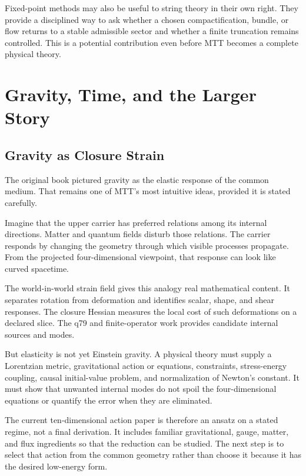 \documentclass[11pt,openany]{book}
\begin{document}
Fixed-point methods may also be useful to string theory in their own right.
They provide a disciplined way to ask whether a chosen compactification,
bundle, or flow returns to a stable admissible sector and whether a finite
truncation remains controlled. This is a potential contribution even before
MTT becomes a complete physical theory.

\part{Gravity, Time, and the Larger Story}

\chapter{Gravity as Closure Strain}

The original book pictured gravity as the elastic response of the common
medium. That remains one of MTT's most intuitive ideas, provided it is stated
carefully.

Imagine that the upper carrier has preferred relations among its internal
directions. Matter and quantum fields disturb those relations. The carrier
responds by changing the geometry through which visible processes propagate.
From the projected four-dimensional viewpoint, that response can look like
curved spacetime.

The world-in-world strain field gives this analogy real mathematical
content. It separates rotation from deformation and identifies scalar,
shape, and shear responses. The closure Hessian measures the local cost of
such deformations on a declared slice. The q79 and finite-operator work
provides candidate internal sources and modes.

But elasticity is not yet Einstein gravity. A physical theory must supply a
Lorentzian metric, gravitational action or equations, constraints,
stress-energy coupling, causal initial-value problem, and normalization of
Newton's constant. It must show that unwanted internal modes do not spoil the
four-dimensional equations or quantify the error when they are eliminated.

The current ten-dimensional action paper is therefore an ansatz on a stated
regime, not a final derivation. It includes familiar gravitational, gauge,
matter, and flux ingredients so that the reduction can be studied. The next
step is to select that action from the common geometry rather than choose it
because it has the desired low-energy form.
\end{document}
